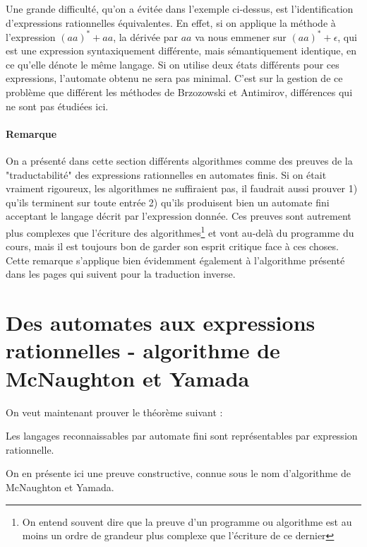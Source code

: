 Une grande difficulté, qu'on a évitée dans l'exemple ci-dessus, est l'identification d'expressions rationnelles équivalentes. En effet, si on applique la méthode à l'expression $(aa)^*+aa$, la dérivée par $aa$ va nous emmener sur $(aa)^* + \epsilon$, qui est une expression syntaxiquement différente, mais sémantiquement identique, en ce qu'elle dénote le même langage. Si on utilise deux états différents pour ces expressions, l'automate obtenu ne sera pas minimal. C'est sur la gestion de ce problème que différent les méthodes de Brzozowski et Antimirov, différences qui ne sont pas étudiées ici. 



\paragraph*{Remarque} On a présenté dans cette section différents algorithmes comme des preuves de la "traductabilité" des expressions rationnelles en automates finis. Si on était vraiment rigoureux, les algorithmes ne suffiraient pas, il faudrait aussi prouver 1) qu'ils terminent sur toute entrée 2) qu'ils produisent bien un automate fini acceptant le langage décrit par l'expression donnée. Ces preuves sont autrement plus complexes que l'écriture des algorithmes\footnote{On entend souvent dire que la preuve d'un programme ou algorithme est au moins un ordre de grandeur plus complexe que l'écriture de ce dernier} et vont au-delà du programme du cours, mais il est toujours bon de garder son esprit critique face à ces choses. Cette remarque s'applique bien évidemment également à l'algorithme présenté dans les pages qui suivent pour la traduction inverse.



\section{Des automates aux expressions rationnelles - algorithme de McNaughton et Yamada}

On veut maintenant prouver le théorème suivant :

\begin{theorem}
Les langages reconnaissables par automate fini sont représentables par expression rationnelle.
\end{theorem}

On en présente ici une preuve constructive, connue sous le nom d'algorithme de McNaughton et Yamada.

